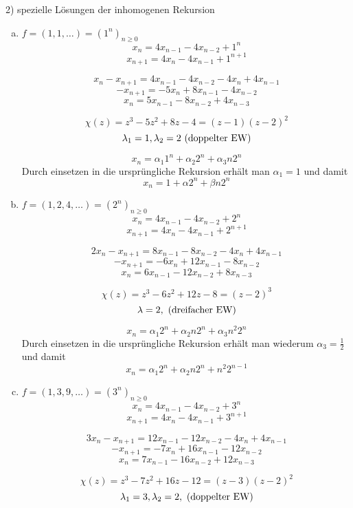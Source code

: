 \begin{paragraph}{2)}
  spezielle Lösungen der inhomogenen Rekursion
  \begin{enumerate}[(a)]
    \item $f = (1, 1, \dots) = (1^{n})_{n\geq 0}$
      \[ x_{n} = 4x_{n-1} - 4x_{n-2} + 1^{n} \]
      \[ x_{n+1} = 4x_{n} - 4x_{n-1} + 1^{n+1} \]

      \[ x_{n} - x_{n+1} = 4x_{n-1} - 4x_{n-2} - 4x_{n} + 4x_{n-1} \]
      \[ -x_{n+1} = -5x_{n} + 8x_{n-1} - 4x_{n-2} \]
      \[ x_{n} = 5x_{n-1} - 8x_{n-2} + 4x_{n-3} \]

      \[ \chi(z) = z^{3} - 5z^{2} + 8z -  4 = (z - 1) (z - 2)^{2} \]
      \[ \lambda_{1} = 1, \lambda_{2} = 2 \textnormal{ (doppelter EW)} \]

      \[ x_{n} = \alpha_{1}1^{n} + \alpha_{2}2^{n} + \alpha_{3}n2^{n} \]
      Durch einsetzen in die ursprüngliche Rekursion erhält man $\alpha_{1} =
      1$ und damit
      \[ x_{n} = 1 + \alpha 2^{n} + \beta n2^{n} \]
    \item $f = (1, 2, 4, \dots) = (2^{n})_{n\geq 0}$
      \[ x_{n} = 4x_{n-1} - 4x_{n-2} + 2^{n} \]
      \[ x_{n+1} = 4x_{n} - 4x_{n-1} + 2^{n+1} \]

      \[ 2x_{n} - x_{n+1} = 8x_{n-1} - 8x_{n-2} - 4x_{n} + 4x_{n-1} \]
      \[ -x_{n+1} = -6x_{n} + 12x_{n-1} - 8x_{n-2} \]
      \[ x_{n} = 6x_{n-1} - 12x_{n-2} + 8x_{n-3} \]

      \[ \chi(z) = z^{3} - 6z^{2} + 12z - 8 = (z - 2)^{3} \]
      \[ \lambda = 2, \textnormal{ (dreifacher EW)} \]

      \[ x_{n} = \alpha_{1}2^{n} + \alpha_{2}n2^{n} + \alpha_{3}n^{2}2^{n} \]
      Durch einsetzen in die ursprüngliche Rekursion erhält man wiederum
      $\alpha_{3} = \frac{1}{2}$ und damit
      \[ x_{n} = \alpha_1 2^{n} + \alpha_2 n2^{n} + n^{2}2^{n-1}\]
    \item $f = (1, 3, 9, \dots) = (3^{n})_{n\geq 0}$
      \[ x_{n} = 4x_{n-1} - 4x_{n-2} + 3^{n} \]
      \[ x_{n+1} = 4x_{n} - 4x_{n-1} + 3^{n+1} \]

      \[ 3x_{n} - x_{n+1} = 12x_{n-1} - 12x_{n-2} - 4x_{n} + 4x_{n-1} \]
      \[ -x_{n+1} = -7x_{n} + 16x_{n-1} - 12x_{n-2} \]
      \[ x_{n} = 7x_{n-1} - 16x_{n-2} + 12x_{n-3} \]

      \[ \chi(z) = z^{3} - 7z^{2} + 16z - 12 = (z - 3) (z - 2)^{2} \]
      \[ \lambda_{1} = 3, \lambda_{2} = 2, \textnormal{ (doppelter EW)} \]


\end{enumerate}
\end{paragraph}
